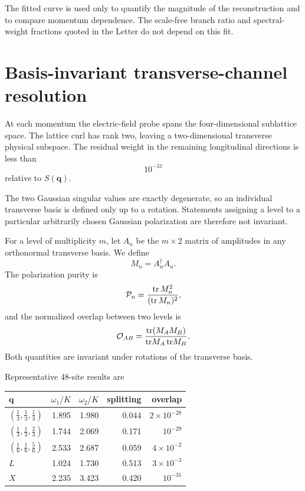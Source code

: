 \documentclass[
aps,
prl,
onecolumn,
amsmath,
amssymb,
superscriptaddress,
longbibliography
]{revtex4-2}
\newcommand{\bq}{\bm q}
\begin{document}
The fitted curve is used only to quantify the magnitude of the
reconstruction and to compare momentum dependence.
The scale-free branch ratio and spectral-weight fractions quoted in
the Letter do not depend on this fit.

\section{Basis-invariant transverse-channel resolution}
\label{sec:polarization}

At each momentum the electric-field probe spans the four-dimensional
sublattice space.
The lattice curl has rank two, leaving a two-dimensional transverse
physical subspace.
The residual weight in the remaining longitudinal directions is less
than
\begin{equation}
10^{-31}
\end{equation}
relative to $S(\bq)$.

The two Gaussian singular values are exactly degenerate, so an
individual transverse basis is defined only up to a rotation.
Statements assigning a level to a particular arbitrarily chosen
Gaussian polarization are therefore not invariant.

For a level of multiplicity $m$, let $A_n$ be the
$m\times2$ matrix of amplitudes in any orthonormal transverse basis.
We define
\begin{equation}
M_n
=
A_n^\dagger A_n .
\end{equation}
The polarization purity is
\begin{equation}
{\cal P}_n
=
\frac{
\mathrm{tr}\,M_n^2
}{
(\mathrm{tr}\,M_n)^2
},
\end{equation}
and the normalized overlap between two levels is
\begin{equation}
{\cal O}_{AB}
=
\frac{
\mathrm{tr}(M_AM_B)
}{
\mathrm{tr}M_A\,
\mathrm{tr}M_B
}.
\end{equation}
Both quantities are invariant under rotations of the transverse
basis.

Representative 48-site results are
\begin{center}
\begin{tabular}{lrrrr}
\hline\hline
$\bq$
&
$\omega_1/K$
&
$\omega_2/K$
&
splitting
&
overlap
\\
\hline
$(\frac13,\frac13,\frac13)$
&1.895&1.980&0.044&$2\times10^{-28}$
\\
$(\frac13,\frac13,\frac23)$
&1.744&2.069&0.171&$10^{-29}$
\\
$(\frac16,\frac16,\frac56)$
&2.533&2.687&0.059&$4\times10^{-2}$
\\
$L$
&1.024&1.730&0.513&$3\times10^{-3}$
\\
$X$
&2.235&3.423&0.420&$10^{-31}$
\\
\hline\hline
\end{tabular}
\end{center}
\end{document}
